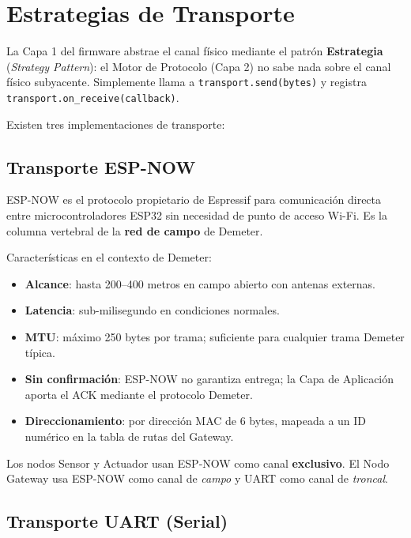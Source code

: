 \section{Estrategias de Transporte}

La Capa 1 del firmware abstrae el canal físico mediante el patrón \textbf{Estrategia}
(\textit{Strategy Pattern}): el Motor de Protocolo (Capa 2) no sabe nada sobre el
canal físico subyacente. Simplemente llama a \texttt{transport.send(bytes)} y
registra \texttt{transport.on\_receive(callback)}.

Existen tres implementaciones de transporte:

\subsection{Transporte ESP-NOW}

ESP-NOW es el protocolo propietario de Espressif para comunicación directa entre
microcontroladores ESP32 sin necesidad de punto de acceso Wi-Fi. Es la columna vertebral
de la \textbf{red de campo} de Demeter.

Características en el contexto de Demeter:
\begin{itemize}[leftmargin=*, label=--]
    \item \textbf{Alcance}: hasta 200--400 metros en campo abierto con antenas externas.
    \item \textbf{Latencia}: sub-milisegundo en condiciones normales.
    \item \textbf{MTU}: máximo 250 bytes por trama; suficiente para cualquier trama Demeter típica.
    \item \textbf{Sin confirmación}: ESP-NOW no garantiza entrega; la Capa de Aplicación aporta
          el ACK mediante el protocolo Demeter.
    \item \textbf{Direccionamiento}: por dirección MAC de 6 bytes, mapeada a un ID numérico
          en la tabla de rutas del Gateway.
\end{itemize}

Los nodos Sensor y Actuador usan ESP-NOW como canal \textbf{exclusivo}. El Nodo Gateway
usa ESP-NOW como canal de \textit{campo} y UART como canal de \textit{troncal}.

\subsection{Transporte UART (Serial)}

